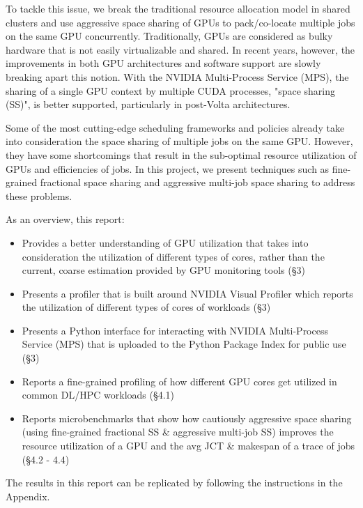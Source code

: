 \documentclass{article}
\begin{document}
To tackle this issue, we break the traditional resource allocation model in shared clusters and use aggressive space sharing of GPUs to pack/co-locate multiple jobs on the same GPU concurrently. Traditionally, GPUs are considered as bulky hardware that is not easily virtualizable and shared. In recent years, however, the improvements in both GPU architectures and software support are slowly breaking apart this notion. With the NVIDIA Multi-Process Service (MPS), the sharing of a single GPU context by multiple CUDA processes, "space sharing (SS)", is better supported, particularly in post-Volta architectures. 

Some of the most cutting-edge scheduling frameworks and policies already take into consideration the space sharing of multiple jobs on the same GPU. However, they have some shortcomings that result in the sub-optimal resource utilization of GPUs and efficiencies of jobs. In this project, we present techniques such as fine-grained fractional space sharing and aggressive multi-job space sharing to address these problems.

As an overview, this report:
\begin{itemize}
\item Provides a better understanding of GPU utilization that takes into consideration the utilization of different types of cores, rather than the current, coarse estimation provided by GPU monitoring tools (§3)
\item Presents a profiler that is built around NVIDIA Visual Profiler which reports the utilization of different types of cores of workloads (§3)
\item Presents a Python interface for interacting with NVIDIA Multi-Process Service (MPS) \cite{mps} that is uploaded to the Python Package Index for public use (§3)
\item Reports a fine-grained profiling of how different GPU cores get utilized in common DL/HPC workloads (§4.1)
\item Reports microbenchmarks that show how cautiously aggressive space sharing (using fine-grained fractional SS \& aggressive multi-job SS) improves the resource utilization of a GPU and the avg JCT \& makespan of a trace of jobs (§4.2 - 4.4)
\end{itemize}

The results in this report can be replicated by following the instructions in the Appendix.
\end{document}
